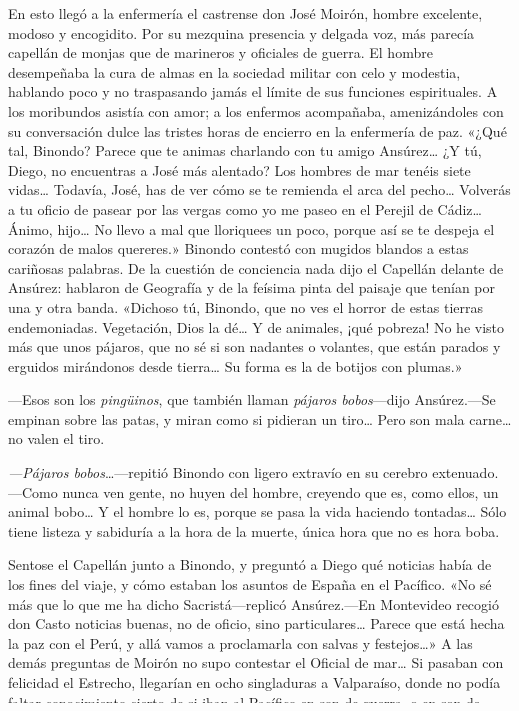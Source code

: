 \documentclass[oneside,12pt,spanish,]{extbook} %
\begin{document}
En esto llegó a la enfermería el castrense don José Moirón, hombre
excelente, modoso y encogidito. Por su mezquina presencia y delgada voz,
más parecía capellán de monjas que de marineros y oficiales de guerra.
El hombre desempeñaba la cura de almas en la sociedad militar con celo y
modestia, hablando poco y no traspasando jamás el límite de sus
funciones espirituales. A los moribundos asistía con amor; a los
enfermos acompañaba, amenizándoles con su conversación dulce las tristes
horas de encierro en la enfermería de paz. «¿Qué tal, Binondo? Parece
que te animas charlando con tu amigo Ansúrez\ldots{} ¿Y tú, Diego, no
encuentras a José más alentado? Los hombres de mar tenéis siete
vidas\ldots{} Todavía, José, has de ver cómo se te remienda el arca del
pecho\ldots{} Volverás a tu oficio de pasear por las vergas como yo me
paseo en el Perejil de Cádiz\ldots{} Ánimo, hijo\ldots{} No llevo a mal
que lloriquees un poco, porque así se te despeja el corazón de malos
quereres.» Binondo contestó con mugidos blandos a estas cariñosas
palabras. De la cuestión de conciencia nada dijo el Capellán delante de
Ansúrez: hablaron de Geografía y de la feísima pinta del paisaje que
tenían por una y otra banda. «Dichoso tú, Binondo, que no ves el horror
de estas tierras endemoniadas. Vegetación, Dios la dé\ldots{} Y de
animales, ¡qué pobreza! No he visto más que unos pájaros, que no sé si
son nadantes o volantes, que están parados y erguidos mirándonos desde
tierra\ldots{} Su forma es la de botijos con plumas.»

---Esos son los \emph{pingüinos}, que también llaman \emph{pájaros
bobos}---dijo Ansúrez.---Se empinan sobre las patas, y miran como si
pidieran un tiro\ldots{} Pero son mala carne\ldots{} no valen el tiro.

\emph{---Pájaros bobos}\ldots---repitió Binondo con ligero extravío en
su cerebro extenuado.---Como nunca ven gente, no huyen del hombre,
creyendo que es, como ellos, un animal bobo\ldots{} Y el hombre lo es,
porque se pasa la vida haciendo tontadas\ldots{} Sólo tiene listeza y
sabiduría a la hora de la muerte, única hora que no es hora boba.

Sentose el Capellán junto a Binondo, y preguntó a Diego qué noticias
había de los fines del viaje, y cómo estaban los asuntos de España en el
Pacífico. «No sé más que lo que me ha dicho Sacristá---replicó
Ansúrez.---En Montevideo recogió don Casto noticias buenas, no de
oficio, sino particulares\ldots{} Parece que está hecha la paz con el
Perú, y allá vamos a proclamarla con salvas y festejos\ldots» A las
demás preguntas de Moirón no supo contestar el Oficial de mar\ldots{} Si
pasaban con felicidad el Estrecho, llegarían en ocho singladuras a
Valparaíso, donde no podía faltar conocimiento cierto de si iban al
Pacífico en son de guerra, o en son de \emph{pingüinos}, por otro nombre
\emph{pájaros bobos}.
\end{document}
